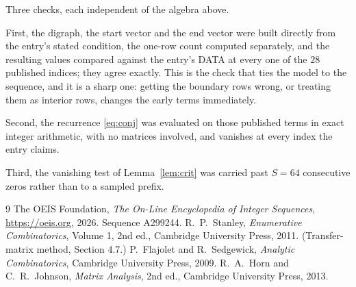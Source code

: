 \documentclass[11pt,a4paper]{article}
\theoremstyle{plain}
\theoremstyle{definition}
\begin{document}
Three checks, each independent of the algebra above.

First, the digraph, the start vector and the end vector were built directly from the
entry's stated condition, the one-row count computed separately, and the resulting values
compared against the entry's DATA at every one of the $28$ published indices; they
agree exactly. This is the check that ties the model to the sequence, and it is a sharp one:
getting the boundary rows wrong, or treating them as interior rows, changes the early terms
immediately.

Second, the recurrence \eqref{eq:conj} was evaluated on those published terms in exact
integer arithmetic, with no matrices involved, and vanishes at every index the entry claims.

Third, the vanishing test of Lemma~\ref{lem:crit} was carried past $S=64$ consecutive
zeros rather than to a sampled prefix.

\begin{thebibliography}{9}
 The OEIS Foundation, \emph{The On-Line Encyclopedia of Integer
Sequences}, \url{https://oeis.org}, 2026. Sequence A299244.
 R.~P.~Stanley, \emph{Enumerative Combinatorics}, Volume 1, 2nd ed.,
Cambridge University Press, 2011. (Transfer-matrix method, Section 4.7.)
 P.~Flajolet and R.~Sedgewick, \emph{Analytic Combinatorics}, Cambridge
University Press, 2009.
 R.~A.~Horn and C.~R.~Johnson, \emph{Matrix Analysis}, 2nd ed., Cambridge
University Press, 2013.
\end{thebibliography}
\end{document}
